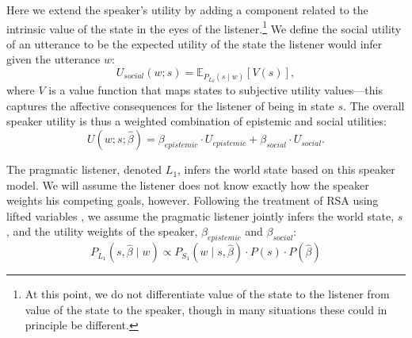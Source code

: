 \documentclass[10pt,letterpaper]{article}
\newcommand{\denote}[1]{\mbox{ $[\![ #1 ]\!]$}}
\newcommand{\ndg}[1]{\textcolor{Green}{[ndg: #1]}}
\begin{document}
Here we extend the speaker's utility by adding a component related to the intrinsic value of the state in the eyes of the listener.\footnote{At this point, we do not differentiate value of the state to the listener from value of the state to the speaker, though in many situations these could in principle be different.}
%
We define the social utility of an utterance to be the expected utility of the state the listener would infer given the utterance $w$:
$$
U_{social}(w; s) = \mathbb{E}_{P_{L_0}(s \mid w)}[V(s)],
$$
%
where $V$ is a value function that maps states to subjective utility values---this captures the affective consequences for the listener of being in state $s$.
The overall speaker utility is thus a weighted combination of epistemic and social utilities:
$$
U(w;s;  \hat{\beta}) = \beta_{epistemic}\cdot U_{epistemic} + \beta_{social} \cdot U_{social}.
$$
%
%


The pragmatic listener, denoted $L_1$, infers the world state based on this speaker model.
We will assume the listener does not know exactly how the speaker weights his competing goals, however.
Following the treatment of RSA using lifted variables \cite{GoodmanLassiter2015, bergen2016, Kao2014},
we assume the pragmatic listener jointly infers the world state, $s$, and the utility weights of the speaker, $\beta_{epistemic}$ and $\beta_{social}$:
\begin{equation}
P_{L_1}(s,  \hat{\beta} \mid w)\propto P_{S_1}(w \mid s,  \hat{\beta})\cdot P(s) \cdot P( \hat{\beta}) \label{eq:L1}
\end{equation}
\end{document}
